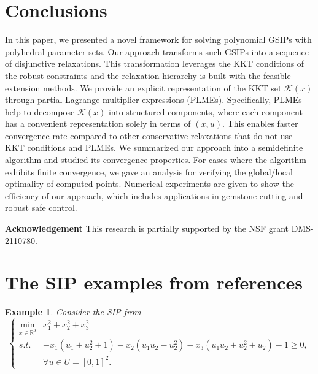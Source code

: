 \documentclass{amsart}
\theoremstyle{plain}
\newtheorem{exmp}[theorem]{Example}
\newcommand{\re}{\mathbb{R}}
\newcommand{\st}{\mathit{s.t.}}
\newcommand{\mc}[1]{\mathcal{#1}}
\numberwithin{equation}{section}
\begin{document}
	
	
	
	
	
	
	\section{Conclusions}\label{sc:con}
	In this paper, we presented a novel framework for solving polynomial GSIPs 
    with polyhedral parameter sets. 
    Our approach transforms such GSIPs into a sequence of disjunctive relaxations.
    This transformation leverages the KKT conditions of the robust constraints
    and the relaxation hierarchy is built with the feasible extension methods.
    We provide an explicit representation of the KKT set $\mc{K}(x)$ through
    partial Lagrange multiplier expressions (PLMEs).
    Specifically, PLMEs help to decompose $\mc{K}(x)$ into structured components,
    where each component has a convenient representation solely in terms of $(x,u)$.
    This enables faster convergence rate compared to other conservative relaxations that
    do not use KKT conditions and PLMEs.
    We summarized our approach into a semidefinite algorithm and studied its convergence properties. 
    For cases where the algorithm exhibits finite convergence,
    we gave an analysis for verifying the global/local optimality of computed points. 
    Numerical experiments are given to show the efficiency of our approach, 
    which includes applications in gemstone-cutting and robust safe control.
	
	
	\medskip \noindent
	{\bf Acknowledgement}
	This research is partially supported by the NSF grant DMS-2110780.	
		
		
		
		
		
		
		
		
		\appendix
		\section{The SIP examples from references}
		\label{sc:appen}
			\begin{exmp} \label{Example6.1} Consider the SIP from \cite{coope1985projected,wang2014semidefinite}
			\begin{equation*}
				\left\{
				\begin{array}{cl}
					\min\limits_{x\in\re^3} & x^2_1+x^2_2+x^2_3 \\
					\st & -x_1(u_1+u^2_2+1)-x_2(u_1u_2-u^2_2)-x_3(u_1u_2+u^2_2+u_2)-1\geq 0,\\
					&\forall u\in U=[0,1]^2.
				\end{array}
				\right.
			\end{equation*}
		\end{exmp}
		
\end{document}
